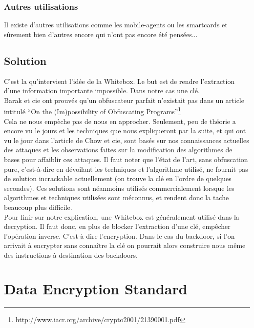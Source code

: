 \documentclass[a4paper,12pt]{article}
\begin{document}
\subsubsection{Autres utilisations}

Il existe d'autres utilisations comme les mobile-agents ou les smartcards et sûrement bien d'autres encore qui n'ont pas encore été pensées...


\subsection{Solution}

C'est la qu'intervient l'idée de la Whitebox. Le but est de rendre l'extraction d'une information importante impossible. Dans notre cas une clé.\\
Barak et cie ont prouvés qu'un obfuscateur parfait n'existait pas dans un article intitulé ``On the (Im)possibility of Obfuscating Programs''\footnote{http://www.iacr.org/archive/crypto2001/21390001.pdf}\\
Cela ne nous empèche pas de nous en approcher. Seulement, peu de théorie a encore vu le jours et les techniques que nous expliqueront par la suite, et qui ont vu le jour dans l'article de Chow et cie, sont basés sur nos connaissances actuelles des attaques et les observations faites sur la modification des algorithmes de bases pour affaiblir ces attaques. Il faut noter que l'état de l'art, sans obfuscation pure, c'est-à-dire en dévoilant les techniques et l'algorithme utilisé, ne fournit pas de solution incrackable actuellement (on trouve la clé en l'ordre de quelques secondes). Ces solutions sont néanmoins utilisés commercialement lorsque les algorithmes et techniques utilisées sont méconnus, et rendent donc la tache beaucoup plus difficile.\\
Pour finir sur notre explication, une Whitebox est généralement utilisé dans la decryption. Il faut donc, en plus de blocker l'extraction d'une clé, empêcher l'opération inverse. C'est-à-dire l'encryption. Dans le cas du backdoor, si l'on arrivait à encrypter sans connaître la clé on pourrait alors construire nous même des instructions à destination des backdoors.\\

\newpage
	
\section{Data Encryption Standard}
\end{document}
